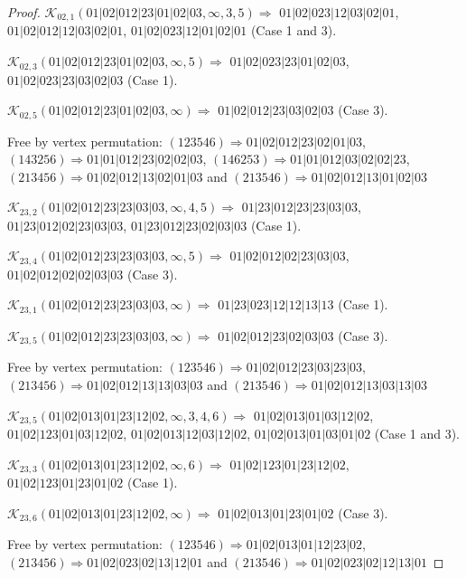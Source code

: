 \documentclass[12pt]{article}
\theoremstyle{plain}
\theoremstyle{definition}
\theoremstyle{remark}
\newcommand{\fancy}[1]{\mathcal{#1}}
\def\K{\fancy{K}}
\begin{document}
\begin{proof}
	
	
	\bigskip
	
	$\K_{02,1}(01|02|012|23|01|02|03,\infty,3, 5)\Rightarrow $ $01|02|023|12|03|02|01$, $01|02|012|12|03|02|01$, $01|02|023|12|01|02|01$ (Case 1 and 3).
	
	$\K_{02,3}(01|02|012|23|01|02|03,\infty,5)\Rightarrow $ $01|02|023|23|01|02|03$, $01|02|023|23|03|02|03$ (Case 1).
	
	$\K_{02,5}(01|02|012|23|01|02|03,\infty)\Rightarrow $ $01|02|012|23|03|02|03$ (Case 3).
	
	
	
	Free by vertex permutation: $(1 2 3 5 4 6)\Rightarrow 01|02|012|23|02|01|03$, $(1 4 3 2 5 6)\Rightarrow 01|01|012|23|02|02|03$, $(1 4 6 2 5 3)\Rightarrow 01|01|012|03|02|02|23$, $(2 1 3 4 5 6)\Rightarrow 01|02|012|13|02|01|03$ and $(2 1 3 5 4 6)\Rightarrow 01|02|012|13|01|02|03$
	
	
	
	\bigskip
	
	$\K_{23,2}(01|02|012|23|23|03|03,\infty,4, 5)\Rightarrow $ $01|23|012|23|23|03|03$, $01|23|012|02|23|03|03$, $01|23|012|23|02|03|03$ (Case 1).
	
	$\K_{23,4}(01|02|012|23|23|03|03,\infty,5)\Rightarrow $ $01|02|012|02|23|03|03$, $01|02|012|02|02|03|03$ (Case 3).
	
	$\K_{23,1}(01|02|012|23|23|03|03,\infty)\Rightarrow $ $01|23|023|12|12|13|13$ (Case 1).
	
	$\K_{23,5}(01|02|012|23|23|03|03,\infty)\Rightarrow $ $01|02|012|23|02|03|03$ (Case 3).
	
	
	
	Free by vertex permutation: $(1 2 3 5 4 6)\Rightarrow 01|02|012|23|03|23|03$, $(2 1 3 4 5 6)\Rightarrow 01|02|012|13|13|03|03$ and $(2 1 3 5 4 6)\Rightarrow 01|02|012|13|03|13|03$
	
	
	
	\bigskip
	
	$\K_{23,5}(01|02|013|01|23|12|02,\infty,3, 4, 6)\Rightarrow $ $01|02|013|01|03|12|02$, $01|02|123|01|03|12|02$, $01|02|013|12|03|12|02$, $01|02|013|01|03|01|02$ (Case 1 and 3).
	
	$\K_{23,3}(01|02|013|01|23|12|02,\infty,6)\Rightarrow $ $01|02|123|01|23|12|02$, $01|02|123|01|23|01|02$ (Case 1).
	
	$\K_{23,6}(01|02|013|01|23|12|02,\infty)\Rightarrow $ $01|02|013|01|23|01|02$ (Case 3).
	
	
	
	Free by vertex permutation: $(1 2 3 5 4 6)\Rightarrow 01|02|013|01|12|23|02$, $(2 1 3 4 5 6)\Rightarrow 01|02|023|02|13|12|01$ and $(2 1 3 5 4 6)\Rightarrow 01|02|023|02|12|13|01$
	

\end{proof}
\end{document}
